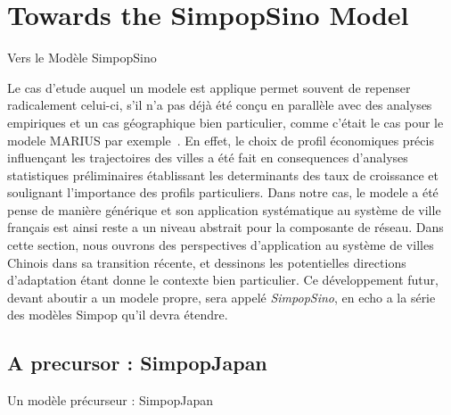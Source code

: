 





\section{Towards the SimpopSino Model}{Vers le Modèle SimpopSino}


\label{sec:simpopsino}


Le cas d'etude auquel un modele est applique permet souvent de repenser radicalement celui-ci, s'il n'a pas déjà été conçu en parallèle avec des analyses empiriques et un cas géographique bien particulier, comme c'était le cas pour le modele MARIUS par exemple~\cite{cottineau2014evolution}. En effet, le choix de profil économiques précis influençant les trajectoires des villes a été fait en consequences d'analyses statistiques préliminaires établissant les determinants des taux de croissance et soulignant l'importance des profils particuliers. Dans notre cas, le modele a été pense de manière générique et son application systématique au système de ville français est ainsi reste a un niveau abstrait pour la composante de réseau. Dans cette section, nous ouvrons des perspectives d'application au système de villes Chinois dans sa transition récente, et dessinons les potentielles directions d'adaptation étant donne le contexte bien particulier. Ce développement futur, devant aboutir a un modele propre, sera appelé \emph{SimpopSino}, en echo a la série des modèles Simpop qu'il devra étendre.




\subsection{A precursor : SimpopJapan}{Un modèle précurseur : SimpopJapan}


